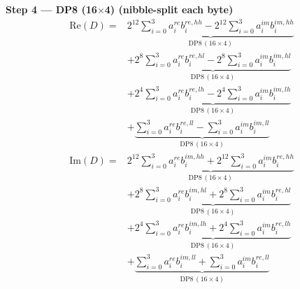 \documentclass[fleqn]{article}
\newcommand{\DPop}[3]{\mathrm{DP#1}\,(#2\!\times\!#3)}
\begin{document}
\noindent\textbf{Step 4 --- DP8 (16$\times$4) \quad (nibble-split each byte)}
\begin{align*}
\mathrm{Re}(D) = {}
  & \underbrace{2^{12}\sum_{i=0}^{3} a_i^{re} b_i^{re,hh} - 2^{12}\sum_{i=0}^{3} a_i^{im} b_i^{im,hh}}_{\DPop{8}{16}{4}} \\[0.7em]
  & + \underbrace{2^{8}\sum_{i=0}^{3} a_i^{re} b_i^{re,hl} - 2^{8}\sum_{i=0}^{3} a_i^{im} b_i^{im,hl}}_{\DPop{8}{16}{4}} \\[0.7em]
  & + \underbrace{2^{4}\sum_{i=0}^{3} a_i^{re} b_i^{re,lh} - 2^{4}\sum_{i=0}^{3} a_i^{im} b_i^{im,lh}}_{\DPop{8}{16}{4}} \\[0.7em]
  & + \underbrace{\sum_{i=0}^{3} a_i^{re} b_i^{re,ll} - \sum_{i=0}^{3} a_i^{im} b_i^{im,ll}}_{\DPop{8}{16}{4}}
\end{align*}
\begin{align*}
\mathrm{Im}(D) = {}
  & \underbrace{2^{12}\sum_{i=0}^{3} a_i^{re} b_i^{im,hh} + 2^{12}\sum_{i=0}^{3} a_i^{im} b_i^{re,hh}}_{\DPop{8}{16}{4}} \\[0.7em]
  & + \underbrace{2^{8}\sum_{i=0}^{3} a_i^{re} b_i^{im,hl} + 2^{8}\sum_{i=0}^{3} a_i^{im} b_i^{re,hl}}_{\DPop{8}{16}{4}} \\[0.7em]
  & + \underbrace{2^{4}\sum_{i=0}^{3} a_i^{re} b_i^{im,lh} + 2^{4}\sum_{i=0}^{3} a_i^{im} b_i^{re,lh}}_{\DPop{8}{16}{4}} \\[0.7em]
  & + \underbrace{\sum_{i=0}^{3} a_i^{re} b_i^{im,ll} + \sum_{i=0}^{3} a_i^{im} b_i^{re,ll}}_{\DPop{8}{16}{4}}
\end{align*}

\vspace{0.3em}
\end{document}

